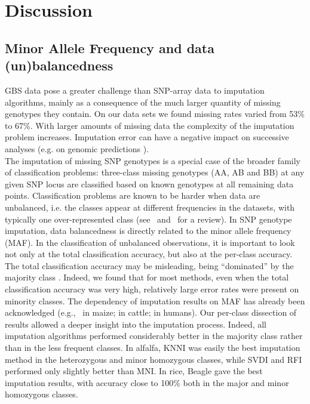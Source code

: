 \section{Discussion}
\label{sec:discussion}

\subsection{Minor Allele Frequency and data (un)balancedness}
\label{sec:maf}
GBS data pose a greater challenge than SNP-array data to imputation algorithms, mainly as a consequence of the much larger quantity of missing genotypes they contain. On our data sets we found missing rates varied from 53\% to 67\%. With larger amounts of missing data the complexity of the imputation problem increases. Imputation error can have a negative impact on successive analyses (e.g. on genomic predictions \cite{rutkoski_imputation_2013,Annicchiarico2015}).\\
The imputation of missing SNP genotypes is a special case of the broader family of classification problems: three-class missing genotypes (AA, AB and BB) at any given SNP locus are classified based on known genotypes at all remaining data points. Classification problems are known to be harder when data are unbalanced, i.e. the classes appear at different frequencies in the datasets, with typically one over-represented class
(see~\cite{kotsiantis_handling_2006}
and~\cite{sun_classification_2009} for a review). In SNP genotype imputation, data balancedness is directly related to the minor allele frequency (MAF). In the classification of unbalanced observations, it is important to look not only at the total classification accuracy, but also at the per-class accuracy. The total classification accuracy may be misleading, being ``dominated'' by the majority class
\cite{he_learning_2009}.
Indeed, we found that for most methods, even when the total classification accuracy was very high, relatively large error rates were present on minority classes. 
The dependency of imputation results on MAF has already been acknowledged  (e.g.,~\cite{hickey_factors_2012} in maize; \cite{ma_comparison_2013} in cattle; \cite{pei_analyses_2008} in humans). Our per-class dissection of results allowed a deeper insight into the imputation process. Indeed, all imputation algorithms performed considerably better in the majority class rather than in the less frequent classes.
In alfalfa, KNNI was easily the best imputation method in the heterozygous and minor homozygous classes, while SVDI and RFI performed only slightly better than MNI. In rice, Beagle gave the best imputation results, with accuracy close to 100\% both in the major and minor homozygous classes.

